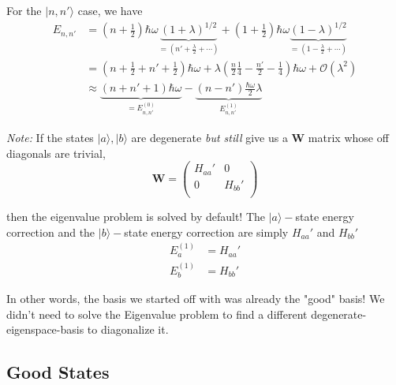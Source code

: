 \documentclass{article}
\newcommand{\ket}[1]{|#1 \rangle}
\begin{document}
\vskip 0.25cm
For the $\ket{n,n'}$ case, we have 
\begin{align*}
  E_{n,n'} &= \left( n + \frac{1}{2} \right) \hbar \omega \underbrace{\left( 1 + \lambda \right)^{1/2}}_{=\left( n' + \frac{\lambda}{2} + \cdots \right)} + \left( 1 + \frac{1}{2} \right) \hbar \omega \underbrace{\left( 1 - \lambda \right)^{1/2}}_{=\left( 1 - \frac{\lambda}{2} + \cdots \right)} \\
  &= \left( n + \frac{1}{2} + n' + \frac{1}{2} \right)\hbar \omega + \lambda \left( \frac{n}{2} \frac{1}{4} - \frac{n'}{2} - \frac{1}{4} \right) \hbar \omega + \mathcal{O}(\lambda^2) \\
  &\approx \underbrace{(n + n' + 1)\hbar \omega}_{=E_{n,n'}^{(0)}} - \underbrace{(n - n')\frac{\hbar \omega}{2} \lambda }_{E_{n,n'}^{(1)}}
\end{align*}

\begin{dottedbox}
  \emph{Note:} If the states $\ket{a}, \ket{b}$ are degenerate \emph{but still} give us a $\mathbf{W}$ matrix whose off diagonals are trivial, 
  \[ \mathbf{W} = \begin{pmatrix}
    H_{aa}' & 0 \\
    0 & H_{bb}'\\
  \end{pmatrix} \]

  then the eigenvalue problem is solved by default! The $\ket{a}-$state energy correction and the $\ket{b}-$state energy correction are simply $H_{aa}'$ and $H_{bb}'$
  \begin{align*}
    E_{a}^{(1)} &= H_{aa}' \\
    E_{b}^{(1)} &= H_{bb}' 
  \end{align*}

  In other words, the basis we started off with was already the "good" basis! We didn't need to solve the Eigenvalue problem to find a different degenerate-eigenspace-basis to diagonalize it.
\end{dottedbox}

\vskip 1cm
\subsection{Good States}
\end{document}
